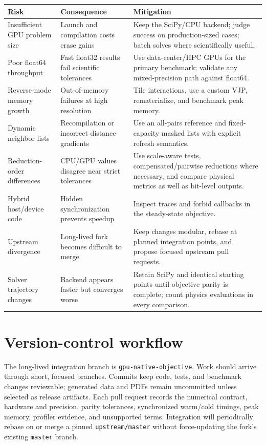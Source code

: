 \documentclass[11pt,a4paper]{article}
\newcommand{\code}[1]{\texttt{#1}}
\begin{document}
{\scriptsize
\begin{longtable}{p{}p{}p{}}
\toprule
Risk & Consequence & Mitigation \\
\midrule
Insufficient GPU problem size & Launch and compilation costs erase gains & Keep
  the SciPy/CPU backend; judge success on production-sized cases; batch solves
  where scientifically useful. \\
Poor float64 throughput & Fast float32 results fail scientific tolerances & Use
  data-center/HPC GPUs for the primary benchmark; validate any mixed-precision
  path against float64. \\
Reverse-mode memory growth & Out-of-memory failures at high resolution & Tile
  interactions, use a custom VJP, rematerialize, and benchmark peak memory. \\
Dynamic neighbor lists & Recompilation or incorrect distance gradients & Use an
  all-pairs reference and fixed-capacity masked lists with explicit refresh
  semantics. \\
Reduction-order differences & CPU/GPU values disagree near strict tolerances &
  Use scale-aware tests, compensated/pairwise reductions where necessary, and
  compare physical metrics as well as bit-level outputs. \\
Hybrid host/device code & Hidden synchronization prevents speedup & Inspect
  traces and forbid callbacks in the steady-state objective. \\
Upstream divergence & Long-lived fork becomes difficult to merge & Keep changes
  modular, rebase at planned integration points, and propose focused upstream
  pull requests. \\
Solver trajectory changes & Backend appears faster but converges worse & Retain
  SciPy and identical starting points until objective parity is complete; count
  physics evaluations in every comparison. \\
\bottomrule
\end{longtable}
}

\section{Version-control workflow}

The long-lived integration branch is \code{gpu-native-objective}.  Work should
arrive through short, focused branches.  Commits keep code, tests, and benchmark
changes reviewable; generated data and PDFs remain uncommitted unless selected
as release artifacts.  Each pull request records the numerical contract,
hardware and precision, parity tolerances, synchronized warm/cold timings, peak
memory, profiler evidence, and unsupported terms.  Integration will periodically
rebase on or merge a pinned \code{upstream/master} without force-updating the
fork's existing \code{master} branch.
\end{document}
